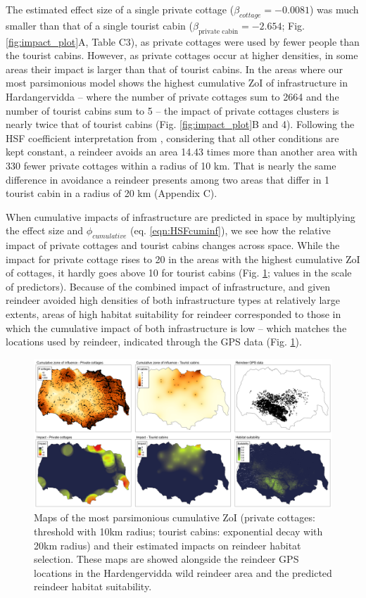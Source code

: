 \documentclass[titlepage]{article}
\begin{document}
The estimated effect size of a single private
cottage ($\beta_{cottage} = -0.0081$) was much smaller than that of a single tourist cabin
($\beta_{\text{private cabin}} = -2.654$; Fig. \ref{fig:impact_plot}A, Table C3), as
private cottages were used by fewer people than the tourist cabins. However, as
private cottages occur at higher densities, in some areas their impact 
is larger than that of tourist cabins. In the areas where our most parsimonious model shows the 
highest cumulative ZoI of infrastructure in Hardangervidda -- where the number of private cottages sum to 2664
and the number of tourist cabins sum to 5 -- the impact of 
private cottages clusters is nearly twice that of tourist cabins
(Fig. \ref{fig:impact_plot}B and 4). Following the HSF coefficient interpretation from \citet{fieberg_how_2021}, considering that all other conditions are kept constant, a reindeer avoids an area 14.43 times more than another area with
330 fewer private cottages within a radius of 10 km. That is nearly the same difference in avoidance a reindeer presents among two areas that differ in 1 tourist cabin in a radius of 20 km (Appendix C).

When cumulative impacts of infrastructure are predicted in space by multiplying the effect size and $\phi_{cumulative}$ (eq. \ref{eqn:HSFcuminf}), we see how the relative impact of private cottages and tourist cabins changes across space. While the impact for private cottage rises to 20 in the areas with the highest cumulative ZoI of cottages, it hardly goes above 10 for tourist cabins (Fig. \ref{fig:prediction_maps}; values in the scale of predictors). Because of the combined impact of infrastructure, and given reindeer
avoided high densities of both infrastructure types at relatively large extents, 
areas of high habitat suitability for reindeer corresponded to those in which the
cumulative impact of both infrastructure is low -- which matches the
locations used by reindeer, indicated through the GPS data (Fig. \ref{fig:prediction_maps}).

\begin{figure}[h]
\centering
\includegraphics[width=1.3\textwidth,center]{figures/reindeer_results_prediction_maps.png}
\caption{\label{fig:prediction_maps} Maps of the most parsimonious cumulative ZoI (private cottages: threshold with 10km radius; tourist cabins: exponential decay with 20km radius) and their estimated impacts on reindeer habitat selection. These maps are showed alongside the reindeer GPS locations in the Hardengervidda wild reindeer area and the predicted reindeer habitat suitability.}
\end{figure}
\end{document}
